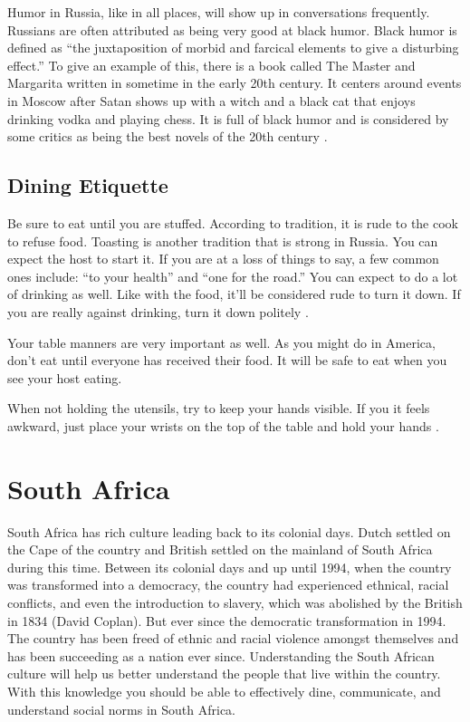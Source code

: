 \documentclass[11pt,a4paper,twoside]{report}
\begin{document}
Humor in Russia, like in all places, will show up in conversations frequently.
Russians are often attributed as being very good at black humor. Black humor is
defined as “the juxtaposition of morbid and farcical elements to give a
disturbing effect.” To give an example of this, there is a book called The
Master and Margarita written in sometime in the early 20th century. It centers
around events in Moscow after Satan shows up with a witch and a black cat that
enjoys drinking vodka and playing chess. It is full of black humor and is
considered by some critics as being the best novels of the 20th century \citep*{bulgakov}.

\section{Dining Etiquette}

Be sure to eat until you are stuffed. According to tradition, it is rude to the
cook to refuse food. Toasting is another tradition that is strong in Russia.
You can expect the host to start it. If you are at a loss of things to say, a
few common ones include: “to your health” and “one for the road.” You can
expect to do a lot of drinking as well. Like with the food, it'll be considered
rude to turn it down. If you are really against drinking, turn it down politely
\citep*{russianDining1}.

Your table manners are very important as well. As you might do in America,
don't eat until everyone has received their food. It will be safe to eat when
you see your host eating.

When not holding the utensils, try to keep your hands visible. If you it feels
awkward, just place your wrists on the top of the table and hold your hands
\citep*{russianDining2}.



\chapter{South Africa}

South Africa has rich culture leading back to its colonial days. Dutch settled
on the Cape of the country and British settled on the mainland of South Africa
during this time. Between its colonial days and up until 1994, when the country
was transformed into a democracy, the country had experienced ethnical, racial
conflicts, and even the introduction to slavery, which was abolished by the
British in 1834 (David Coplan). But ever since the democratic transformation in
1994. The country has been freed of ethnic and racial violence amongst
themselves and has been succeeding as a nation ever since. Understanding the
South African culture will help us better understand the people that live
within the country. With this knowledge you should be able to effectively dine,
communicate, and understand social norms in South Africa.
\end{document}
